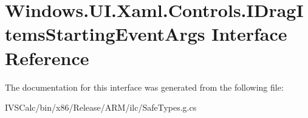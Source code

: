 \hypertarget{interface_windows_1_1_u_i_1_1_xaml_1_1_controls_1_1_i_drag_items_starting_event_args}{}\section{Windows.\+U\+I.\+Xaml.\+Controls.\+I\+Drag\+Items\+Starting\+Event\+Args Interface Reference}
\label{interface_windows_1_1_u_i_1_1_xaml_1_1_controls_1_1_i_drag_items_starting_event_args}


The documentation for this interface was generated from the following file\+:\begin{DoxyCompactItemize}
\item 
I\+V\+S\+Calc/bin/x86/\+Release/\+A\+R\+M/ilc/Safe\+Types.\+g.\+cs\end{DoxyCompactItemize}
